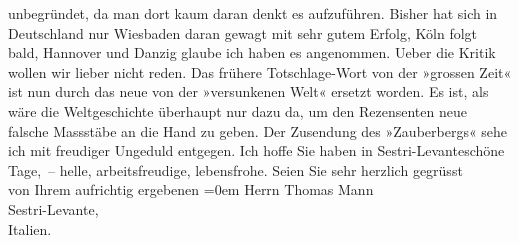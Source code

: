 \begin{ledgroupsized}[t]{13cm}
               unbegründet, da man dort kaum daran denkt es aufzuführen. Bisher hat sich in Deutschland nur Wiesbaden daran gewagt mit sehr gutem Erfolg, Köln folgt bald, Hannover und Danzig glaube ich haben es angenommen. Ueber die
               Kritik wollen wir lieber nicht reden. Das frühere Totschlage-Wort von der »grossen
               Zeit« ist nun durch das neue von der »versunkenen Welt« ersetzt worden. Es ist, als
               wäre die Weltgeschichte überhaupt nur dazu da, um den Rezensenten neue falsche
               Massstäbe an die Hand zu geben.\pend
           \pstart
           Der Zusendung des »Zauberbergs« sehe ich mit
               freudiger Ungeduld entgegen. Ich hoffe Sie haben in Sestri-Levanteschöne Tage, – helle, arbeitsfreudige,
               lebensfrohe.\pend
           \pstart
           Seien Sie sehr herzlich gegrüsst{\\[\baselineskip]}von Ihrem aufrichtig ergebenen\pend
           \leftskip=0em{}\pstart
           \noindent{}Herrn Thomas Mann{\\}Sestri-Levante,{\\}Italien.\pend
           
         
         \endnumbering{}\end{ledgroupsized}  \newcommand{\dateiname}{L02420}\newcommand{\titel}{Arthur Schnitzler an Thomas Mann, 6. 11. 1924}\newcommand{\editorInnen}{Martin Anton Müller und Gerd-Hermann Susen}
      